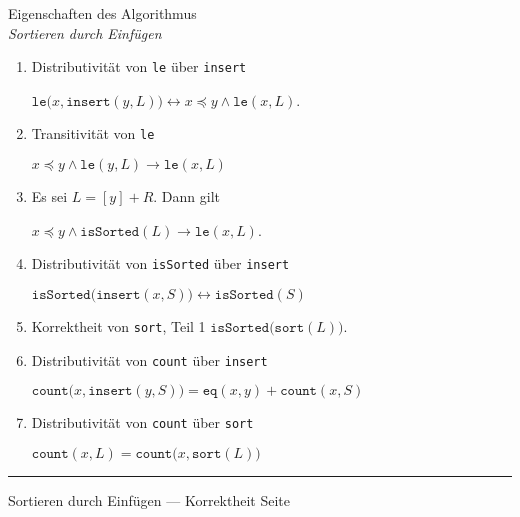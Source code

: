 \documentclass{slides}
\newcounter{mypage}
\begin{document}
\begin{slide}{}
\normalsize

\begin{center}
Eigenschaften des Algorithmus \\ \textsl{Sortieren durch Einf\"ugen}
\end{center}
\vspace*{0.5cm}

\footnotesize
\begin{enumerate}
\item Distributivit\"at von \texttt{le} \"uber \texttt{insert}

      $\mathtt{le}\bigl(x, \mathtt{insert}(y,L) \bigr) \leftrightarrow x \preceq y \wedge \mathtt{le}(x,L)$. 
\item Transitivit\"at von \texttt{le}

      $x \preceq y \wedge \mathtt{le}(y,L) \rightarrow \mathtt{le}(x,L)$

\item Es sei $L = [y] + R$. Dann gilt 

      $x \preceq y \wedge \mathtt{isSorted}(L) \rightarrow \mathtt{le}(x,L)$.

\item Distributivit\"at von \texttt{isSorted} \"uber \texttt{insert}

      $\mathtt{isSorted}\bigl(\mathtt{insert}(x,S) \bigr) \leftrightarrow \mathtt{isSorted}(S)$
\item Korrektheit von \texttt{sort}, Teil 1
      $\mathtt{isSorted}\bigl(\mathtt{sort}(L) \bigr)$. 
\item Distributivit\"at von \texttt{count} \"uber \texttt{insert}

      $\mathtt{count}\bigl(x, \mathtt{insert}(y, S) \bigr) = \mathtt{eq}(x,y) + \mathtt{count}(x,S)$
\item Distributivit\"at von \texttt{count} \"uber \texttt{sort} 

      $\texttt{count}(x,L) = \texttt{count}\bigl(x, \texttt{sort}(L) \bigr)$
\end{enumerate}

\vspace*{\fill}
\tiny \addtocounter{mypage}{1}
\rule{17cm}{1mm}
Sortieren durch Einf\"ugen --- Korrektheit \hspace*{\fill} Seite 
\end{slide}

\end{document}
